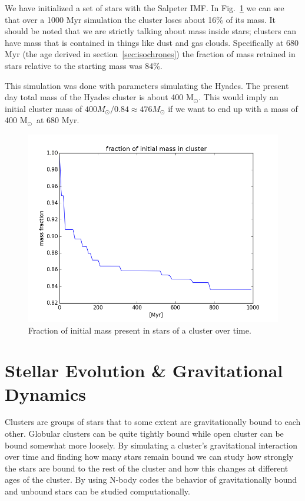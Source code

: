 \documentclass{aa}
\newcommand{\Sun}[0]{\ensuremath{_{\odot}}}
\begin{document}
We have initialized a set of stars with the Salpeter IMF. In Fig.~\ref{fig:massfraction} we can see that over a 1000 Myr simulation the cluster loses about 16\% of its mass. It should be noted that we are strictly talking about mass inside stars; clusters can have mass that is contained in things like dust and gas clouds. Specifically at 680 Myr (the age derived in section~\ref{sec:isochrones}) the fraction of mass retained in stars relative to the starting mass was 84\%. 

This simulation was done with parameters simulating the Hyades. The present day total mass of the Hyades cluster is about 400 M\Sun \citep{2009AIPC.1094..497B}. This would imply an initial cluster mass of $400 M\Sun/0.84 \approx 476 M\Sun$ if we want to end up with a mass of 400 M\Sun \, at 680 Myr. 
\begin{figure}
    \centering
    \includegraphics[width=\hsize]{img/massfraction_over_time.png}
    \caption{Fraction of initial mass present in stars of a cluster over time.}\label{fig:massfraction}
\end{figure}

\section{Stellar Evolution \& Gravitational Dynamics} \label{sec:SE_GD}
Clusters are groups of stars that to some extent are gravitationally bound to each other. Globular clusters can be quite tightly bound while open cluster can be bound somewhat more loosely. By simulating a cluster's gravitational interaction over time and finding how many stars remain bound we can study how strongly the stars are bound to the rest of the cluster and how this changes at different ages of the cluster. By using N-body codes the behavior of gravitationally bound and unbound stars can be studied computationally.
\end{document}
